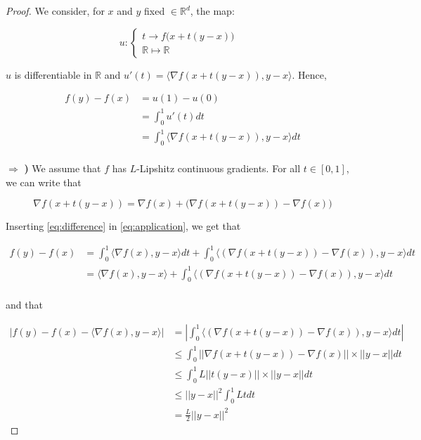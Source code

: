 \documentclass[
10pt, %
a4paper, %
oneside, %
headinclude,footinclude, %
BCOR5mm, %
]{scrartcl}
\begin{document}
\begin{proof}
    We consider, for $x$ and $y$ fixed $\in \mathbb{R}^d$, the map:

$$
u  : \left\{
    \begin{array}{ll}
	t\rightarrow f\big(x+t(y-x)\big) & \\
        \mathbb{R}  \mapsto \mathbb{R} & 
    \end{array}
\right.
$$

    $u$ is differentiable in $ \mathbb{R} $ and $u'(t) = \langle\nabla f(x+t(y-x)), y-x \rangle$. Hence, 

    \begin{equation}
	\begin{aligned}
	    \label{eq:application}
	    f(y)-f(x) &= u(1)-u(0)\\
	    &= \int^{1}_{0} u'(t)  dt \\
	    &= \int^{1}_{0}  \langle\nabla f(x+t(y-x)), y-x \rangle dt \\
	\end{aligned}
    \end{equation}

    $\Rightarrow$ \textbf{{)}}  We assume that $f$ has $L$-Lipshitz continuous gradients.  For all $t\in [0, 1]$, we can write that

    \begin{equation}
	\label{eq:difference}
	\nabla f(x+t(y-x)) = \nabla f(x) +\Big(\nabla f(x+t(y-x))- \nabla f(x)\Big) 
    \end{equation}

    Inserting \ref{eq:difference} in \ref{eq:application}, we get that

    \begin{equation}
	\begin{aligned}
	    \label{eq:}
	    f(y)-f(x) &= \int^{1}_{0} \langle\nabla f(x), y-x \rangle dt +\int^{1}_{0}  \langle(\nabla f(x+t(y-x))- \nabla f(x)) , y-x \rangle   dt \\
	    &= \langle\nabla f(x), y-x \rangle +\int^{1}_{0}  \langle(\nabla f(x+t(y-x))- \nabla f(x)) , y-x \rangle   dt \\
	\end{aligned}
    \end{equation}

    and that

    \begin{equation}
        \begin{aligned}
            \label{eq:}
	    |f(y)-f(x)-\langle\nabla f(x), y-x \rangle| &= |\int^{1}_{0}  \langle(\nabla f(x+t(y-x))- \nabla f(x)) , y-x \rangle   dt |\\
	    &\leq  \int^{1}_{0}  ||\nabla f(x+t(y-x))- \nabla f(x)||\times || y-x|| dt \\
	    &\leq  \int^{1}_{0}  L||t(y-x)||\times|| y-x|| dt \\
	    &\leq  ||y-x||^2\int^{1}_{0}  Ltdt\\
	    &= \frac{L}{2} ||y-x||^2
        \end{aligned}
    \end{equation}

\end{proof}
\end{document}
